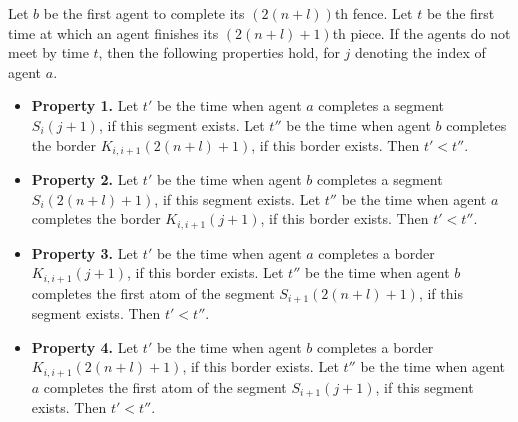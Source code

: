 \documentclass [11pt] {article}
\begin{document}
\begin{lemma}
\label{lem:four}
Let $b$ be the first agent to complete its $(2(n+l))$th fence. {Let $t$ be the first time at which an agent finishes its $(2(n+l)+1)$th piece. If the agents do not meet by time $t$, then
the following properties hold, for $j$ denoting the index of agent $a$}.
\begin{itemize}
\item {\bf Property 1.} Let $t'$ be the time when agent $a$ completes 
a segment $S_{i}(j+1)$, if this segment exists. Let $t''$ be the time when agent $b$ completes 
the border $K_{{i,i+1}}(2(n+l)+1)$, if this border exists. Then $t'<t''$.
\item {\bf Property 2.} Let $t'$ be the time when agent $b$ completes a segment $S_{i}(2(n+l)+1)$, if this segment exists.
Let $t''$ be the time when agent $a$ completes 
the border $K_{{i,i+1}}(j+1)$, if this border exists. Then $t'<t''$.
\item {\bf Property 3.}
 Let $t'$ be the time when agent $a$ completes 
a border $K_{{i,i+1}}(j+1)$, if this border exists. Let $t''$ be the time when agent $b$ completes 
the first atom of the segment $S_{{i+1}}(2(n+l)+1)$, if this segment exists. Then $t'<t''$.
 \item {\bf Property 4.}
Let $t'$ be the time when agent $b$ completes a border $K_{{i,i+1}}(2(n+l)+1)$, if this border exists.
Let $t''$ be the time when agent $a$ completes 
the first atom of the segment $S_{{i+1}}(j+1)$, if this segment exists. Then $t'<t''$. 
\end{itemize}
\end{lemma}
\end{document}
